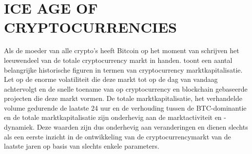 \chapter{ICE AGE OF CRYPTOCURRENCIES}
\label{ch:iceage}

Als de moeder van alle crypto's heeft Bitcoin op het moment van schrijven het leeuwendeel van de totale cryptocurrency markt in handen.  toont een aantal belangrijke historische figuren in termen van cryptocurrency marktkapitalisatie. Let op de enorme volatiliteit die deze markt tot op de dag van vandaag achtervolgt en de snelle toename van op cryptocurrency en blockchain gebaseerde projecten die deze markt vormen. De totale marktkapitalisatie, het verhandelde volume gedurende de laatste 24 uur en de verhouding tussen de BTC-dominantie en de totale marktkapitalisatie zijn onderhevig aan de marktactiviteit en -dynamiek. Deze waarden zijn dus onderhevig aan veranderingen en dienen slechts als een eerste inzicht in de ontwikkeling van de cryptocurrencymarkt van de laatste jaren op basis van slechts enkele parameters.\medskip 


